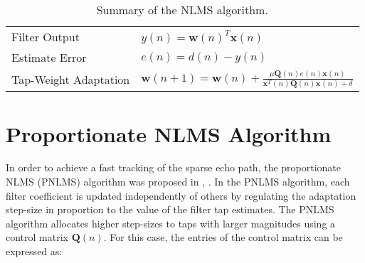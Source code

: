 \begin{table}[ht]
\caption{Summary of the NLMS algorithm.}
\vspace{0.5cm}
\centering
\begin{tabular}{ll}
\hline
\hline
 Filter Output  & $y(n)=\textbf{w}(n)^{T}\textbf{x}(n)$\\
 Estimate Error  & $e(n)=d(n)-y(n)$\\
 Tap-Weight Adaptation & $\textbf{w}(n+1)=\textbf{w}(n)+\frac{\mu \textbf{Q}(n)e(n)\textbf{x}(n)}{\textbf{x}^{T}(n)\textbf{Q}(n)\textbf{x}(n)+\delta}$ \\
 \hline
 \end{tabular}
\label{table:2} %
\end{table}

\vspace{-0.3cm}
\section{Proportionate NLMS Algorithm}\label{sec:3.4}
\vspace{-0.5cm}
\noindent In order to achieve a fast tracking of the sparse echo path, the proportionate NLMS (PNLMS) algorithm was proposed in \cite{Duttweiler}, \cite{Etter}. In the PNLMS algorithm, each filter coefficient is updated independently of others by regulating the adaptation step-size in proportion to the value of the filter tap estimates. The PNLMS algorithm allocates higher step-sizes to taps with larger magnitudes using a control matrix $\textbf{Q}(n)$. For this case, the entries of the control matrix can be expressed as:

